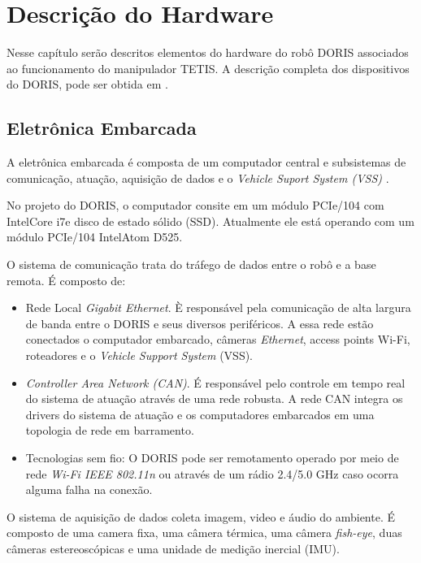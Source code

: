\chapter{Descrição do Hardware} \label{chap:descricao_hard}

Nesse capítulo serão descritos elementos do hardware do robô DORIS associados ao funcionamento do manipulador TETIS. A descrição completa dos dispositivos do DORIS, pode ser obtida em \citep{xaud2016doris, nunes2013doris, freitas2015embedded, galassi2014doris}.

\section{Eletrônica Embarcada}

A eletrônica embarcada é composta de um computador central e subsistemas de comunicação, atuação, aquisição de dados e o \textit{Vehicle Suport System (VSS)} \citep{freitas2015embedded}. 

No projeto do DORIS, o computador consite em um módulo PCIe/104 com Intel\circledR Core i7\texttrademark e disco de estado sólido (SSD). Atualmente ele está operando com um módulo PCIe/104 Intel\circledR Atom D525. 

O sistema de comunicação trata do tráfego de dados entre o robô e a base remota. É composto de:

\begin{itemize}
\item Rede Local \textit{Gigabit Ethernet}. È responsável pela comunicação de alta largura de banda entre o DORIS e seus diversos periféricos. A essa rede estão conectados o computador embarcado, câmeras \textit{Ethernet}, access points Wi-Fi, roteadores e o \textit{Vehicle Support System} (VSS).
\item \textit{Controller Area Network (CAN)}. É responsável pelo controle em tempo real do sistema de atuação através de uma rede robusta. A rede CAN integra os drivers do sistema de atuação e os computadores embarcados em uma topologia de rede em barramento. 

\item Tecnologias sem fio: O DORIS pode ser remotamento operado por meio de rede \textit{Wi-Fi IEEE 802.11n} ou através de um rádio 2.4/5.0 GHz caso ocorra alguma falha na conexão.
\end{itemize}

O sistema de aquisição de dados coleta imagem, video e áudio do ambiente. É composto de uma camera fixa, uma câmera térmica, uma câmera \textit{fish-eye}, duas câmeras estereoscópicas e uma unidade de medição inercial (IMU).

